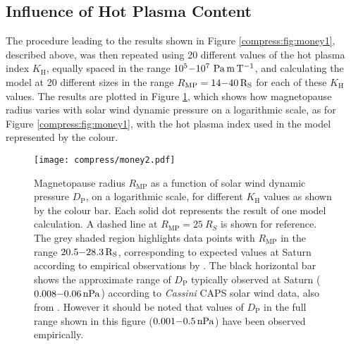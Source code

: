 \subsection{Influence of Hot Plasma Content} \label{compress:sec:hotplasma}
The procedure leading to the results shown in Figure \ref{compress:fig:money1}, described above, was then repeated using 20 different values of the hot plasma index $K_\mathrm{H}$, equally spaced in the range $10^5 {\--} 10^7~\si{\pascal\meter\per\tesla}$, and calculating the model at 20 different sizes in the range $R_\mathrm{MP} = 14{\--}\SI{40}{R_S}$ for each of these $K_\mathrm{H}$ values. The results are plotted in Figure \ref{compress:fig:money2}, which shows how magnetopause radius varies with solar wind dynamic pressure on a logarithmic scale, as for Figure \ref{compress:fig:money1}, with the hot plasma index used in the model represented by the colour.
\begin{figure}
\centering
\noindent\texttt{[image: compress/money2.pdf]}
\caption[Magnetopause radius versus solar wind dynamic pressure compressibility profiles for a range of $K_\mathrm{H}$.]{Magnetopause radius $R_\mathrm{MP}$ as a function of solar wind dynamic pressure $D_\mathrm{P}$, on a logarithmic scale, for different $K_\mathrm{H}$ values as shown by the colour bar. Each solid dot represents the result of one model calculation. A dashed line at $R_\mathrm{MP}{=}\SI{25}{R_S}$ is shown for reference. The grey shaded region highlights data points with $R_\mathrm{MP}$ in the range $20.5{\--}\SI{28.3}{R_S}$, corresponding to expected values at Saturn according to empirical observations by \citet{achilleos2008}. The black horizontal bar shows the approximate range of $D_\mathrm{P}$ typically observed at Saturn ($0.008 {\--} \SI{0.06}{nPa}$) according to \textit{Cassini} CAPS solar wind data, also from \citet{achilleos2008}. However it should be noted that values of $D_\mathrm{P}$ in the full range shown in this figure ($0.001 {\--} \SI{0.5}{nPa}$) have been observed empirically.} 
\label{compress:fig:money2}
\end{figure}
 

